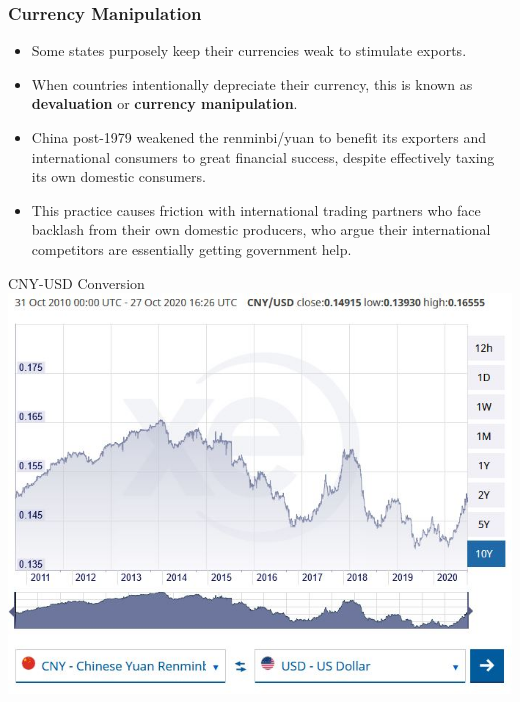 \documentclass[handout]{beamer}
\begin{document}
\begin{frame} 
	\frametitle{\LARGE{Currency Manipulation}}
	\begin{itemize}
			\item Some states purposely keep their currencies weak to stimulate exports. \pause
			\item When countries intentionally depreciate their currency, this is known as \textbf{devaluation} or \textbf{currency manipulation}. \pause 
			\item China post-1979 weakened the renminbi/yuan to benefit its exporters and international consumers to great financial success, despite effectively taxing its own domestic consumers.  \pause
			\item This practice causes friction with international trading partners who face backlash from their own domestic producers, who argue their international competitors are essentially getting government help. 
	\end{itemize}
\end{frame}

\begin{frame}{\LARGE CNY-USD Conversion}
	\centering
	\includegraphics[width=\textwidth,height=0.8\textheight,keepaspectratio]{USD to CNY conversion.JPG}
\end{frame}
\end{document}

